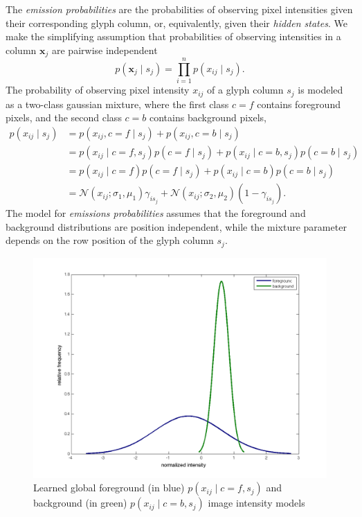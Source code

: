 \documentclass[a4paper,12pt]{article}
\begin{document}
The \emph{emission probabilities} are the probabilities of observing
pixel intensities given their corresponding glyph column, or,
equivalently, given their \emph{hidden states}. We make the
simplifying assumption that probabilities of observing intensities in
a column $\mathbf{x}_j$ are pairwise independent \[p(\mathbf{x}_j \mid
s_j) = \prod_{i=1}^np(x_{ij} \mid s_j).\] The probability of observing
pixel intensity $x_{ij}$ of a glyph column $s_j$ is modeled as a
two-class gaussian mixture, where the first class $c=f$ contains
foreground pixels, and the second class $c=b$ contains background
pixels,
\begin{align*}
  p(x_{ij} \mid s_j) &= p(x_{ij},c=f \mid s_j)+p(x_{ij},c=b \mid s_j)\\
  &= p(x_{ij}\mid c=f,s_j)p(c=f \mid s_j)+p(x_{ij} \mid c=b,s_j)p(c=b \mid s_j) \\
  &= p(x_{ij}\mid c=f)p(c=f \mid s_j)+p(x_{ij} \mid c=b)p(c=b \mid s_j) \\
  &= \mathcal{N}(x_{ij};\sigma_1,\mu_1)\gamma_{is_j}+\mathcal{N}(x_{ij};\sigma_2,\mu_2)(1-\gamma_{is_j}).
\end{align*}
The model for \emph{emissions probabilities} assumes that the
foreground and background distributions are position independent,
while the mixture parameter depends on the row position of the glyph
column $s_j$.

\begin{figure}[htp]
\centering
\includegraphics[width=\linewidth]{pics/distribution.png}
\caption{ Learned global foreground (in blue) $ p(x_{ij}\mid c=f,s_j)$ and
  background (in green) $p(x_{ij} \mid c=b,s_j)$ image intensity models }
\label{fig:distribution}
\end{figure}
\end{document}

